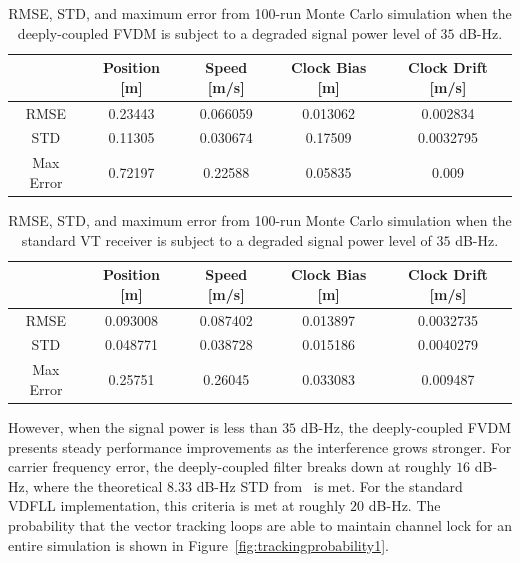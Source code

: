 \begin{table}[!ht]
    \caption{RMSE, STD, and maximum error from 100-run Monte Carlo simulation when the deeply-coupled FVDM is subject to a degraded signal power level of \(35\) dB-Hz.}\label{tbl:straight35FVDM}
    \centering
    \begin{tabular}{ccccc}
        \toprule
                  & Position [m] & Speed [m/s] & Clock Bias [m] & Clock Drift [m/s] \\
        \midrule
        RMSE      & 0.23443      & 0.066059    & 0.013062       & 0.002834          \\
        STD       & 0.11305      & 0.030674    & 0.17509        & 0.0032795         \\
        Max Error & 0.72197      & 0.22588     & 0.05835        & 0.009             \\
        \bottomrule
    \end{tabular}
\end{table}

\begin{table}[!ht]
    \caption{RMSE, STD, and maximum error from 100-run Monte Carlo simulation when the standard VT receiver is subject to a degraded signal power level of \(35\) dB-Hz.}\label{tbl:straight35CV}
    \centering
    \begin{tabular}{ccccc}
        \toprule
                  & Position [m] & Speed [m/s] & Clock Bias [m] & Clock Drift [m/s] \\
        \midrule
        RMSE      & 0.093008     & 0.087402    & 0.013897       & 0.0032735         \\
        STD       & 0.048771     & 0.038728    & 0.015186       & 0.0040279         \\
        Max Error & 0.25751      & 0.26045     & 0.033083       & 0.009487          \\
        \bottomrule
    \end{tabular}
\end{table}

However, when the signal power is less than \(35\) dB-Hz, the deeply-coupled FVDM presents steady performance improvements as the interference grows stronger. For carrier frequency error, the deeply-coupled filter breaks down at roughly \(16\) dB-Hz, where the theoretical \(8.33\) dB-Hz STD from~\cite{lashleyPerformanceAnalysisVector2009} is met. For the standard VDFLL implementation, this criteria is met at roughly \(20\) dB-Hz. The probability that the vector tracking loops are able to maintain channel lock for an entire simulation is shown in Figure~\ref{fig:trackingprobability1}.


